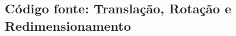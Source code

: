 \documentclass[
	article,			%
	11pt,				%
	oneside,			%
	a4paper,			%
	english,			%
	brazil,				%
	sumario=tradicional
	]{abntex2}
\newcommand{\matlabCodePath}{/home/clifte/git/Mestrado/Matlab/}
\begin{document}

\begin{apendicesenv} 

\chapter{Código fonte: Translação, Rotação e Redimensionamento}
\label{apend:transRotRed}

	
 	\lstset{extendedchars=true,inputencoding=utf8/latin1}
 	



\end{apendicesenv}



\end{document}
